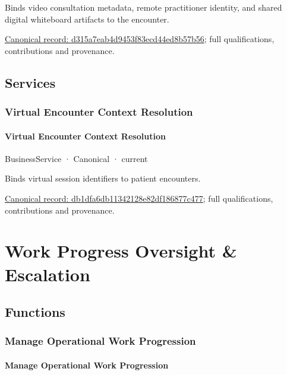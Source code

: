 Binds video consultation metadata, remote practitioner identity, and shared digital whiteboard artifacts to the encounter.


{\footnotesize \href{../../../../continuum/business/business-function/d315a7eab4d9453f83ecd44ed8b57b56.md}{Canonical record: d315a7eab4d9453f83ecd44ed8b57b56}; full qualifications, contributions and provenance.}\par
\subsection{Services}

\subsubsection{Virtual Encounter Context Resolution}

\paragraph{Virtual Encounter Context Resolution}

\label{element:db1dfa6db11342128e82df186877c477}
{\small BusinessService · Canonical · current}\par

Binds virtual session identifiers to patient encounters.


{\footnotesize \href{../../../../continuum/business/business-service/db1dfa6db11342128e82df186877c477.md}{Canonical record: db1dfa6db11342128e82df186877c477}; full qualifications, contributions and provenance.}\par
\section{Work Progress Oversight \& Escalation}

\subsection{Functions}

\subsubsection{Manage Operational Work Progression}

\paragraph{Manage Operational Work Progression}

